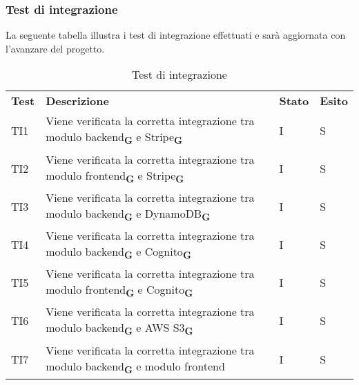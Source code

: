 \subsubsection{Test di integrazione}
La seguente tabella illustra i test di integrazione effettuati e sarà aggiornata con l'avanzare del progetto.
\begin{center}
    \centering
    \renewcommand{\arraystretch}{1.8}
    \label{tab:TestIntegrazione}
    \begin{longtable}[!h]{p{45px} p{255px} p{35px} p{35px}}
        \caption{Test di integrazione}                                                                                                                                                \\
        \rowcolor{logo!70}
        \textbf{Test} & \textbf{Descrizione}                                                                                                        & \textbf{Stato} & \textbf{Esito} \\
        TI1           & Viene verificata la corretta integrazione tra modulo backend\textsubscript{\textbf{G}} e Stripe\textsubscript{\textbf{G}}   & I              & S              \\
        TI2           & Viene verificata la corretta integrazione tra modulo frontend\textsubscript{\textbf{G}} e Stripe\textsubscript{\textbf{G}}  & I              & S              \\
        TI3           & Viene verificata la corretta integrazione tra modulo backend\textsubscript{\textbf{G}} e DynamoDB\textsubscript{\textbf{G}} & I              & S              \\
        TI4           & Viene verificata la corretta integrazione tra modulo backend\textsubscript{\textbf{G}} e Cognito\textsubscript{\textbf{G}}  & I              & S              \\
        TI5           & Viene verificata la corretta integrazione tra modulo frontend\textsubscript{\textbf{G}} e Cognito\textsubscript{\textbf{G}} & I              & S              \\
        TI6           & Viene verificata la corretta integrazione tra modulo backend\textsubscript{\textbf{G}} e AWS S3\textsubscript{\textbf{G}}   & I              & S              \\
        TI7           & Viene verificata la corretta integrazione tra modulo backend\textsubscript{\textbf{G}} e modulo frontend                    & I              & S              \\
    \end{longtable}
\end{center}
\pagebreak
